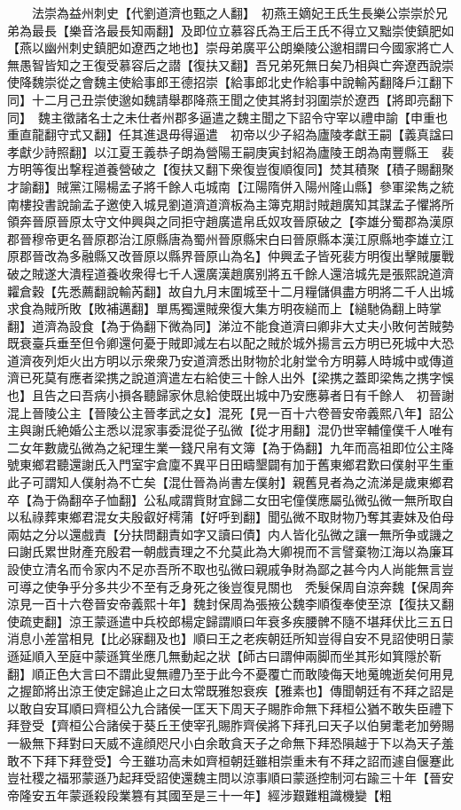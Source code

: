 　　法崇為益州刺史【代劉道濟也甄之人翻】　初燕王嫡妃王氏生長樂公崇崇於兄弟為最長【樂音洛最長知兩翻】及即位立慕容氏為王后王氏不得立又黜崇使鎮肥如【燕以幽州刺史鎮肥如遼西之地也】崇母弟廣平公朗樂陵公邈相謂曰今國家將亡人無愚智皆知之王復受慕容后之譛【復扶又翻】吾兄弟死無日矣乃相與亡奔遼西說崇使降魏崇從之會魏主使給事郎王德招崇【給事郎北史作給事中說輸芮翻降戶江翻下同】十二月己丑崇使邈如魏請舉郡降燕王聞之使其將封羽圍崇於遼西【將即亮翻下同】　魏主徵諸名士之未仕者州郡多逼遣之魏主聞之下詔令守宰以禮申諭【申重也重直龍翻守式又翻】任其進退毋得逼遣　初帝以少子紹為廬陵孝獻王嗣【義真諡曰孝獻少詩照翻】以江夏王義恭子朗為營陽王嗣庚寅封紹為廬陵王朗為南豐縣王　裴方明等復出撃程道養營破之【復扶又翻下衆復豈復順復同】焚其積聚【積子賜翻聚才諭翻】賊黨江陽楊孟子將千餘人屯城南【江陽隋併入陽州隆山縣】參軍梁雋之統南樓投書說諭孟子邀使入城見劉道濟道濟板為主簿克期討賊趙廣知其謀孟子懼將所領奔晉原晉原太守文仲興與之同拒守趙廣遣帛氐奴攻晉原破之【李雄分蜀郡為漢原郡晉穆帝更名晉原郡治江原縣唐為蜀州晉原縣宋白曰晉原縣本漢江原縣地李雄立江原郡晉改為多融縣又改晉原以縣界晉原山為名】仲興孟子皆死裴方明復出擊賊屢戰破之賊遂大潰程道養收衆得七千人還廣漢趙廣别將五千餘人還涪城先是張熙說道濟糶倉穀【先悉薦翻說輸芮翻】故自九月末圍城至十二月糧儲俱盡方明將二千人出城求食為賊所敗【敗補邁翻】單馬獨還賊衆復大集方明夜縋而上【縋馳偽翻上時掌翻】道濟為設食【為于偽翻下微為同】涕泣不能食道濟曰卿非大丈夫小敗何苦賊勢既衰臺兵垂至但令卿還何憂于賊即減左右以配之賊於城外揚言云方明已死城中大恐道濟夜列炬火出方明以示衆衆乃安道濟悉出財物於北射堂令方明募人時城中或傳道濟已死莫有應者梁携之說道濟遣左右給使三十餘人出外【梁携之蓋即梁雋之携字悞也】且告之曰吾病小損各聽歸家休息給使既出城中乃安應募者日有千餘人　初晉謝混上晉陵公主【晉陵公主晉孝武之女】混死【見一百十六卷晉安帝義熙八年】詔公主與謝氏絶婚公主悉以混家事委混從子弘微【從才用翻】混仍世宰輔僮僕千人唯有二女年數歲弘微為之紀理生業一錢尺帛有文簿【為于偽翻】九年而高祖即位公主降號東鄉君聽還謝氏入門室宇倉廩不異平日田疇墾闢有加于舊東鄉君歎曰僕射平生重此子可謂知人僕射為不亡矣【混仕晉為尚書左僕射】親舊見者為之流涕是歲東鄉君卒【為于偽翻卒子恤翻】公私咸謂貲財宜歸二女田宅僮僕應屬弘微弘微一無所取自以私祿葬東鄉君混女夫殷叡好樗蒲【好呼到翻】聞弘微不取財物乃奪其妻妹及伯母兩姑之分以還戲責【分扶問翻責如字又讀曰債】内人皆化弘微之讓一無所争或譏之曰謝氏累世財產充殷君一朝戲責理之不允莫此為大卿視而不言譬棄物江海以為廉耳設使立清名而令家内不足亦吾所不取也弘微曰親戚争財為鄙之甚今内人尚能無言豈可導之使争乎分多共少不至有乏身死之後豈復見關也　秃髮保周自涼奔魏【保周奔涼見一百十六卷晉安帝義熙十年】魏封保周為張掖公魏李順復奉使至涼【復扶又翻使疏吏翻】涼王蒙遜遣中兵校郎楊定歸謂順曰年衰多疾腰髀不隨不堪拜伏比三五日消息小差當相見【比必寐翻及也】順曰王之老疾朝廷所知豈得自安不見詔使明日蒙遜延順入至庭中蒙遜箕坐應几無動起之狀【師古曰謂伸兩脚而坐其形如箕隱於靳翻】順正色大言曰不謂此叟無禮乃至于此今不憂覆亡而敢陵侮天地䰟魄逝矣何用見之握節將出涼王使定歸追止之曰太常既雅恕衰疾【雅素也】傳聞朝廷有不拜之詔是以敢自安耳順曰齊桓公九合諸侯一匡天下周天子賜胙命無下拜桓公猶不敢失臣禮下拜登受【齊桓公合諸侯于葵丘王使宰孔賜胙齊侯將下拜孔曰天子以伯舅耄老加勞賜一級無下拜對曰天威不違顔咫尺小白余敢貪天子之命無下拜恐隕越于下以為天子羞敢不下拜下拜登受】今王雖功高未如齊桓朝廷雖相崇重未有不拜之詔而遽自偃蹇此豈社稷之福邪蒙遜乃起拜受詔使還魏主問以涼事順曰蒙遜控制河右踰三十年【晉安帝隆安五年蒙遜殺段業篡有其國至是三十一年】經涉艱難粗識機變【粗
